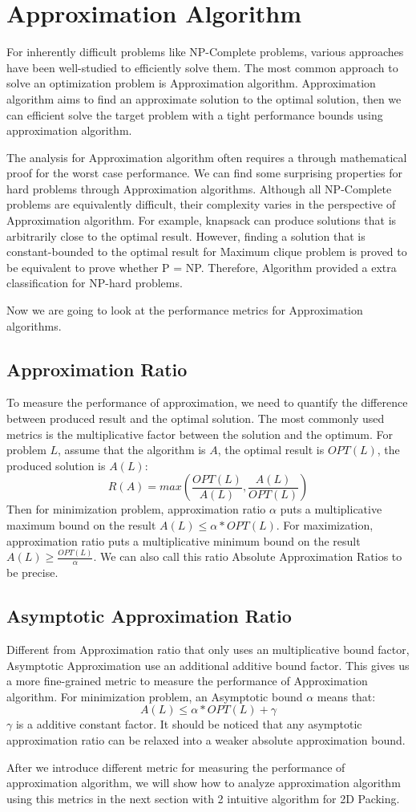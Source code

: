 \documentclass[sigplan,screen,nonacm]{acmart}\settopmatter{printfolios=true,printccs=false,printacmref=false}
\begin{document}
\section{Approximation Algorithm}
For inherently difficult problems like NP-Complete problems, various approaches have been well-studied to efficiently solve them. The most common approach to solve an optimization problem is Approximation algorithm. Approximation algorithm aims to find an approximate solution to the optimal solution, then we can efficient solve the target problem with a tight performance bounds using approximation algorithm.\par
The analysis for Approximation algorithm often requires a through mathematical proof for the worst case performance. We can find some surprising properties for hard problems through Approximation algorithms. Although all NP-Complete problems are equivalently difficult, their complexity varies in the perspective of Approximation algorithm. For example, knapsack can produce solutions that is arbitrarily close to the optimal result. However, finding a solution that is constant-bounded to the optimal result for Maximum clique problem is proved to be equivalent to prove whether P = NP. Therefore, Algorithm provided a extra classification for NP-hard problems.\par
Now we are going to look at the performance metrics for Approximation algorithms.
\subsection{Approximation Ratio}
To measure the performance of approximation, we need to quantify the difference between produced result and the optimal solution. The most commonly used metrics is the multiplicative factor between the solution and the optimum. For problem $L$, assume that the algorithm is $A$, the optimal result is $OPT(L)$, the produced solution is $A(L)$:
$$R(A) = max(\frac{OPT(L)}{A(L)}, \frac{A(L)}{OPT(L)})$$
Then for minimization problem, approximation ratio $\alpha$ puts a multiplicative maximum bound on the result $A(L) \leq \alpha*OPT(L)$. For maximization, approximation ratio puts a multiplicative minimum bound on the result $A(L) \geq \frac{OPT(L)}{\alpha}$. We can also call this ratio Absolute Approximation Ratios to be precise.
\subsection{Asymptotic Approximation Ratio}
Different from Approximation ratio that only uses an multiplicative bound factor, Asymptotic Approximation use an additional additive bound factor. This gives us a more fine-grained metric to measure the performance of Approximation algorithm. For minimization problem, an Asymptotic bound $\alpha$ means that:
$$ A(L) \leq \alpha*OPT(L) + \gamma $$
$\gamma$ is a additive constant factor. It should be noticed that any asymptotic approximation ratio can be relaxed into a weaker absolute approximation bound.\par
After we introduce different metric for measuring the performance of approximation algorithm, we will show how to analyze approximation algorithm using this metrics in the next section with 2 intuitive algorithm for 2D Packing.
\end{document}
